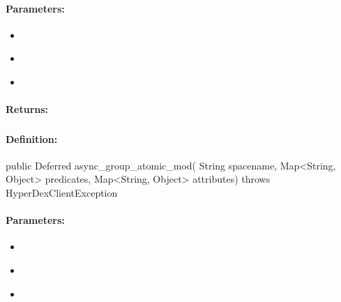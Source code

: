 \paragraph{Parameters:}
\begin{itemize}[noitemsep]
\item {}\\

\item {}\\

\item {}\\

\end{itemize}

\paragraph{Returns:}


\pagebreak
\subsubsection{}
\label{api:java:async_group_atomic_mod}


\paragraph{Definition:}
\begin{javacode}
public Deferred async_group_atomic_mod(
        String spacename,
        Map<String, Object> predicates,
        Map<String, Object> attributes) throws HyperDexClientException
\end{javacode}

\paragraph{Parameters:}
\begin{itemize}[noitemsep]
\item {}\\

\item {}\\

\item {}\\

\end{itemize}

